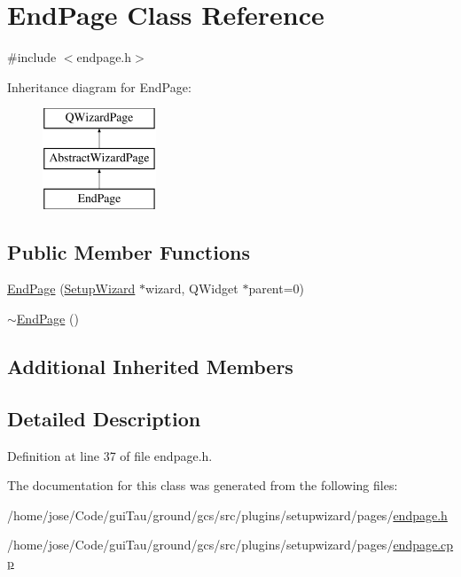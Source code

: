 \hypertarget{class_end_page}{\section{End\-Page Class Reference}
\label{class_end_page}
}


{\ttfamily \#include $<$endpage.\-h$>$}

Inheritance diagram for End\-Page\-:\begin{figure}[H]
\begin{center}
\leavevmode
\includegraphics[height=3.000000cm]{class_end_page}
\end{center}
\end{figure}
\subsection*{Public Member Functions}
\begin{DoxyCompactItemize}
\item 
\hyperlink{group___setup_gaa49419069a19a1a8848036fd03dbf053}{End\-Page} (\hyperlink{class_setup_wizard}{Setup\-Wizard} $\ast$wizard, Q\-Widget $\ast$parent=0)
\item 
\hyperlink{group___setup_ga7fa99955774788be173afc53b98dcc0b}{$\sim$\-End\-Page} ()
\end{DoxyCompactItemize}
\subsection*{Additional Inherited Members}


\subsection{Detailed Description}


Definition at line 37 of file endpage.\-h.



The documentation for this class was generated from the following files\-:\begin{DoxyCompactItemize}
\item 
/home/jose/\-Code/gui\-Tau/ground/gcs/src/plugins/setupwizard/pages/\hyperlink{endpage_8h}{endpage.\-h}\item 
/home/jose/\-Code/gui\-Tau/ground/gcs/src/plugins/setupwizard/pages/\hyperlink{endpage_8cpp}{endpage.\-cpp}\end{DoxyCompactItemize}
